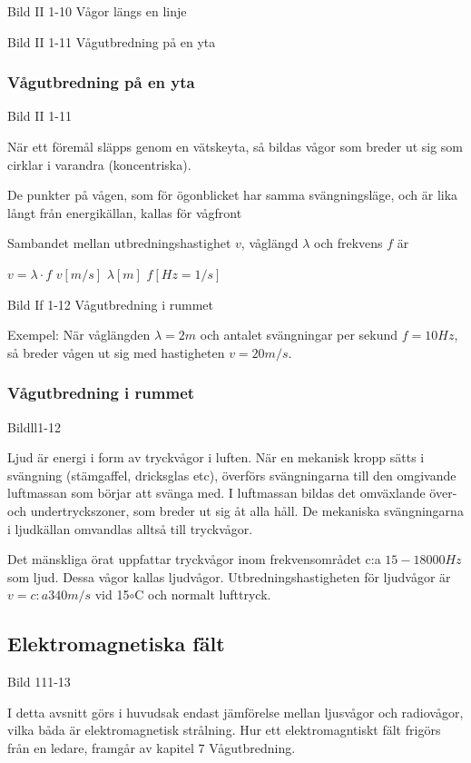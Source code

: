 \documentclass[a4paper,twoside,twocolumn,openright]{book}
\begin{document}
Bild II 1-10 Vågor längs en linje

Bild II 1-11 Vågutbredning på en yta

\subsubsection{Vågutbredning på en yta}

Bild II 1-11

När ett föremål släpps genom en vätskeyta, så bildas vågor som breder ut sig som cirklar
i varandra (koncentriska).

De punkter på vågen, som för ögonblicket har samma svängningsläge, och är lika långt från
energikällan, kallas för vågfront

Sambandet mellan utbredningshastighet $v$, våglängd $\lambda$ och frekvens $f$ är

$v = \lambda \cdot f$ $v [m/s]$ $\lambda [m]$ $f [Hz=1/s]$

Bild If 1-12 Vågutbredning i rummet

Exempel: När våglängden $\lambda = 2 m$ och antalet svängningar per sekund $f = 10 Hz$,
så breder vågen ut sig med hastigheten $v = 20 m/s$.

\subsubsection{Vågutbredning i rummet}

Bildll1-12

Ljud är energi i form av tryckvågor i luften. När en mekanisk kropp sätts i svängning
(stämgaffel, dricksglas etc), överförs svängningarna till den omgivande luftmassan som
börjar att svänga med. I luftmassan bildas det omväxlande över- och undertryckszoner, som
breder ut sig åt alla håll. De mekaniska svängningarna i ljudkällan omvandlas alltså till
tryckvågor.

Det mänskliga örat uppfattar tryckvågor inom frekvensområdet c:a $15-18000 Hz$ som ljud.
Dessa vågor kallas ljudvågor. Utbredningshastigheten för ljudvågor är $v = c:a 340 m/s$ vid 
15$\circ$C och normalt lufttryck.

\subsection{Elektromagnetiska fält}

Bild 111-13

I detta avsnitt görs i huvudsak endast jämförelse mellan ljusvågor och radiovågor, vilka
båda är elektromagnetisk strålning. Hur ett elektromagntiskt fält frigörs från en ledare,
framgår av kapitel 7 Vågutbredning.
\end{document}
